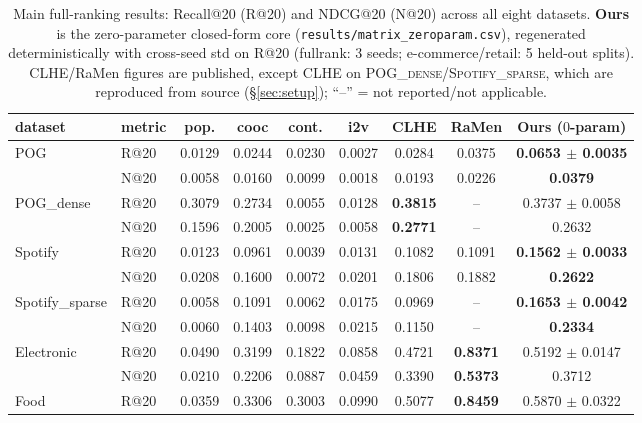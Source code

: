 \begin{table}[t]\centering\small
\caption{Main full-ranking results: Recall@20 (R@20) and NDCG@20 (N@20) across all eight datasets.
\textbf{Ours} is the zero-parameter closed-form core (\texttt{results/matrix\_zeroparam.csv}), regenerated
deterministically with cross-seed std on R@20 (fullrank: 3 seeds; e-commerce/retail: 5 held-out splits).
CLHE/RaMen figures are published, except CLHE on \textsc{POG\_dense}/\textsc{Spotify\_sparse}, which are reproduced
from source (\S\ref{sec:setup}); ``--'' = not reported/not applicable.}
\label{tab:main}
\setlength{\tabcolsep}{4.0pt}
\begin{tabular}{llccccccc}
\toprule
dataset & metric & pop. & cooc & cont. & i2v & CLHE & RaMen & \textbf{Ours ($0$-param)} \\
\midrule
\multirow{2}{*}{POG}            & R@20 & 0.0129 & 0.0244 & 0.0230 & 0.0027 & 0.0284 & 0.0375 & \textbf{0.0653 $\pm$ 0.0035} \\
                                & N@20 & 0.0058 & 0.0160 & 0.0099 & 0.0018 & 0.0193 & 0.0226 & \textbf{0.0379} \\
\midrule
\multirow{2}{*}{POG\_dense}     & R@20 & 0.3079 & 0.2734 & 0.0055 & 0.0128 & \textbf{0.3815} & --     & 0.3737 $\pm$ 0.0058 \\
                                & N@20 & 0.1596 & 0.2005 & 0.0025 & 0.0058 & \textbf{0.2771} & --     & 0.2632 \\
\midrule
\multirow{2}{*}{Spotify}        & R@20 & 0.0123 & 0.0961 & 0.0039 & 0.0131 & 0.1082 & 0.1091 & \textbf{0.1562 $\pm$ 0.0033} \\
                                & N@20 & 0.0208 & 0.1600 & 0.0072 & 0.0201 & 0.1806 & 0.1882 & \textbf{0.2622} \\
\midrule
\multirow{2}{*}{Spotify\_sparse}& R@20 & 0.0058 & 0.1091 & 0.0062 & 0.0175 & 0.0969 & --     & \textbf{0.1653 $\pm$ 0.0042} \\
                                & N@20 & 0.0060 & 0.1403 & 0.0098 & 0.0215 & 0.1150 & --     & \textbf{0.2334} \\
\midrule
\multirow{2}{*}{Electronic}     & R@20 & 0.0490 & 0.3199 & 0.1822 & 0.0858 & 0.4721 & \textbf{0.8371} & 0.5192 $\pm$ 0.0147 \\
                                & N@20 & 0.0210 & 0.2206 & 0.0887 & 0.0459 & 0.3390 & \textbf{0.5373} & 0.3712 \\
\midrule
\multirow{2}{*}{Food}           & R@20 & 0.0359 & 0.3306 & 0.3003 & 0.0990 & 0.5077 & \textbf{0.8459} & 0.5870 $\pm$ 0.0322 \\

\end{tabular}
\end{table}
